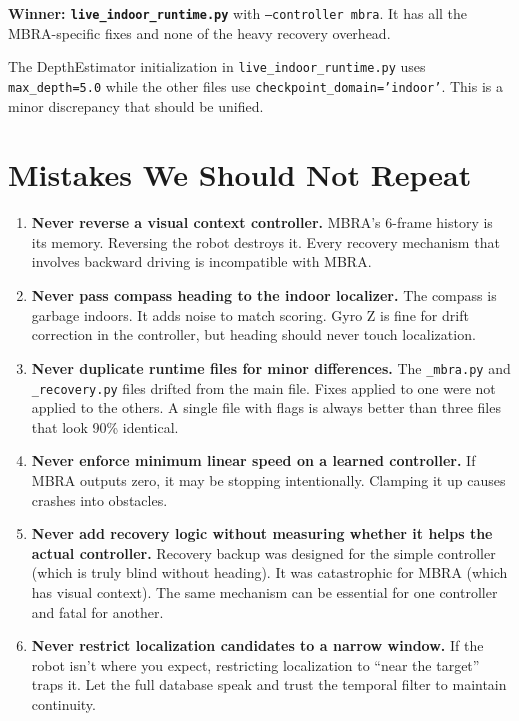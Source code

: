 \documentclass[11pt]{article}
\begin{document}
\textbf{Winner: \texttt{live\_indoor\_runtime.py}} with \texttt{--controller mbra}. It has all the MBRA-specific fixes and none of the heavy recovery overhead.

The DepthEstimator initialization in \texttt{live\_indoor\_runtime.py} uses \texttt{max\_depth=5.0} while the other files use \texttt{checkpoint\_domain='indoor'}. This is a minor discrepancy that should be unified.


\section{Mistakes We Should Not Repeat}

\begin{enumerate}
\item \textbf{Never reverse a visual context controller.} MBRA's 6-frame history is its memory. Reversing the robot destroys it. Every recovery mechanism that involves backward driving is incompatible with MBRA.

\item \textbf{Never pass compass heading to the indoor localizer.} The compass is garbage indoors. It adds noise to match scoring. Gyro Z is fine for drift correction in the controller, but heading should never touch localization.

\item \textbf{Never duplicate runtime files for minor differences.} The \texttt{\_mbra.py} and \texttt{\_recovery.py} files drifted from the main file. Fixes applied to one were not applied to the others. A single file with flags is always better than three files that look 90\% identical.

\item \textbf{Never enforce minimum linear speed on a learned controller.} If MBRA outputs zero, it may be stopping intentionally. Clamping it up causes crashes into obstacles.

\item \textbf{Never add recovery logic without measuring whether it helps the actual controller.} Recovery backup was designed for the simple controller (which is truly blind without heading). It was catastrophic for MBRA (which has visual context). The same mechanism can be essential for one controller and fatal for another.

\item \textbf{Never restrict localization candidates to a narrow window.} If the robot isn't where you expect, restricting localization to ``near the target'' traps it. Let the full database speak and trust the temporal filter to maintain continuity.


\end{enumerate}
\end{document}

